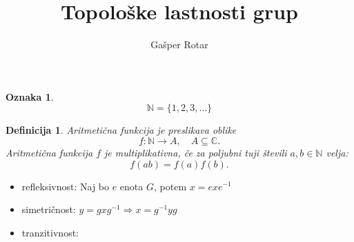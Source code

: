 \documentclass{beamer}
\title{Topološke lastnosti grup}
\author{Gašper Rotar}
\institute{Fakulteta za matematiko in fiziko}
\def\N{\mathbb{N}} %
\def\C{\mathbb{C}} %
\newtheorem{definicija}{Definicija}
\newtheorem{oznaka}{Oznaka}
\begin{document}

\begin{frame}
\titlepage
\end{frame}


\begin{frame}

\begin{oznaka}
\[
\N = \{1,2,3,\ldots\}
\]
\end{oznaka}

\pause
\medskip
\begin{definicija}
\alert{Aritmetična funkcija} je preslikava oblike
\[
f: \N \to A, \quad A \subseteq \C.
\]
\pause
Aritmetična funkcija $f$ je \alert{multiplikativna}, če za poljubni tuji števili $a, b \in \N$ velja:
\[
f(ab) = f(a)f(b).
\]
\end{definicija}

\end{frame}

\begin{frame}
    \begin{itemize}
        \item refleksivnost: Naj bo $e$ enota $G$, potem $x = exe^{-1}$
        \item simetričnost: $y = gxg^{-1} \Rightarrow x = g^{-1}yg$
        \item tranzitivnost:
    \end{itemize} 
\end{frame}
\end{document}
